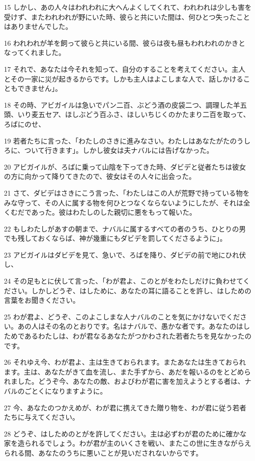 \par 15 しかし、あの人々はわれわれに大へんよくしてくれて、われわれは少しも害を受けず、またわれわれが野にいた時、彼らと共にいた間は、何ひとつ失ったことはありませんでした。
\par 16 われわれが羊を飼って彼らと共にいる間、彼らは夜も昼もわれわれのかきとなってくれました。
\par 17 それで、あなたは今それを知って、自分のすることを考えてください。主人とその一家に災が起きるからです。しかも主人はよこしまな人で、話しかけることもできません」。
\par 18 その時、アビガイルは急いでパン二百、ぶどう酒の皮袋二つ、調理した羊五頭、いり麦五セア、ほしぶどう百ふさ、ほしいちじくのかたまり二百を取って、ろばにのせ、
\par 19 若者たちに言った、「わたしのさきに進みなさい。わたしはあなたがたのうしろに、ついて行きます」。しかし彼女は夫ナバルには告げなかった。
\par 20 アビガイルが、ろばに乗って山陰を下ってきた時、ダビデと従者たちは彼女の方に向かって降りてきたので、彼女はその人々に出会った。
\par 21 さて、ダビデはさきにこう言った、「わたしはこの人が荒野で持っている物をみな守って、その人に属する物を何ひとつなくならないようにしたが、それは全くむだであった。彼はわたしのした親切に悪をもって報いた。
\par 22 もしわたしがあすの朝まで、ナバルに属するすべての者のうち、ひとりの男でも残しておくならば、神が幾重にもダビデを罰してくださるように」。
\par 23 アビガイルはダビデを見て、急いで、ろばを降り、ダビデの前で地にひれ伏し、
\par 24 その足もとに伏して言った、「わが君よ、このとがをわたしだけに負わせてください。しかしどうぞ、はしために、あなたの耳に語ることを許し、はしための言葉をお聞きください。
\par 25 わが君よ、どうぞ、このよこしまな人ナバルのことを気にかけないでください。あの人はその名のとおりです。名はナバルで、愚かな者です。あなたのはしためであるわたしは、わが君なるあなたがつかわされた若者たちを見なかったのです。
\par 26 それゆえ今、わが君よ、主は生きておられます。またあなたは生きておられます。主は、あなたがきて血を流し、また手ずから、あだを報いるのをとどめられました。どうぞ今、あなたの敵、およびわが君に害を加えようとする者は、ナバルのごとくになりますように。
\par 27 今、あなたのつかえめが、わが君に携えてきた贈り物を、わが君に従う若者たちに与えてください。
\par 28 どうぞ、はしためのとがを許してください。主は必ずわが君のために確かな家を造られるでしょう。わが君が主のいくさを戦い、またこの世に生きながらえられる間、あなたのうちに悪いことが見いだされないからです。
